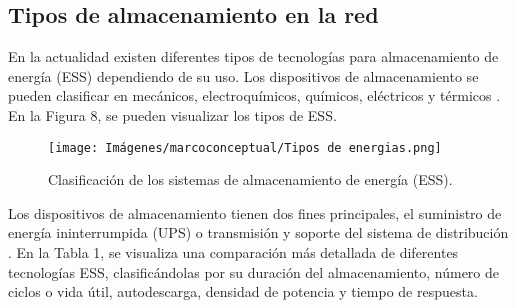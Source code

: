 \subsection{Tipos de almacenamiento en la red}
En la actualidad existen diferentes tipos de tecnologías para almacenamiento de energía (ESS) dependiendo de su uso. Los dispositivos de almacenamiento se pueden clasificar en mecánicos, electroquímicos, químicos, eléctricos y térmicos \cite{Handbook}. En la Figura 8, se pueden visualizar los tipos de ESS.
\begin{figure}[h!]
    \begin{center}
    \centering
    \texttt{[image: Imágenes/marcoconceptual/Tipos de energias.png]}
	\caption{ Clasificación de  los sistemas de almacenamiento de energía (ESS)\cite{bess_distritall}.}
    \end{center}
\end{figure}
\newpage
Los dispositivos de almacenamiento tienen dos fines principales, el suministro de energía ininterrumpida (UPS) o transmisión y soporte del sistema de distribución \cite{Handbook}. En la Tabla 1, se visualiza una comparación más detallada de diferentes tecnologías ESS, clasificándolas por su duración del almacenamiento, número de ciclos o vida útil, autodescarga, densidad de  potencia y tiempo de respuesta.
